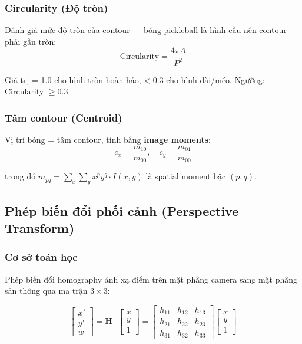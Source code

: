\documentclass[12pt,a4paper]{article}
\begin{document}
\subsubsection{Circularity (Độ tròn)}
Đánh giá mức độ tròn của contour --- bóng pickleball là hình cầu nên contour phải gần tròn:
\begin{equation}
\text{Circularity} = \frac{4\pi A}{P^2}
\label{eq:circularity}
\end{equation}

Giá trị = 1.0 cho hình tròn hoàn hảo, < 0.3 cho hình dài/méo. Ngưỡng: Circularity $\geq 0.3$.

\subsubsection{Tâm contour (Centroid)}
Vị trí bóng = tâm contour, tính bằng \textbf{image moments}:
\begin{equation}
c_x = \frac{m_{10}}{m_{00}}, \quad c_y = \frac{m_{01}}{m_{00}}
\end{equation}

trong đó $m_{pq} = \sum_{x} \sum_{y} x^p y^q \cdot I(x,y)$ là spatial moment bậc $(p, q)$.

\subsection{Phép biến đổi phối cảnh (Perspective Transform)}
\label{sec:perspective}

\subsubsection{Cơ sở toán học}
Phép biến đổi homography ánh xạ điểm trên mặt phẳng camera sang mặt phẳng sân thông qua ma trận $3 \times 3$:

\begin{equation}
\begin{bmatrix} x' \\ y' \\ w \end{bmatrix} = 
\mathbf{H} \cdot \begin{bmatrix} x \\ y \\ 1 \end{bmatrix} =
\begin{bmatrix} h_{11} & h_{12} & h_{13} \\ h_{21} & h_{22} & h_{23} \\ h_{31} & h_{32} & h_{33} \end{bmatrix}
\begin{bmatrix} x \\ y \\ 1 \end{bmatrix}
\end{equation}
\end{document}
